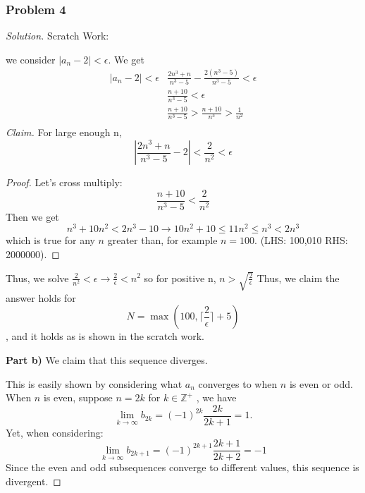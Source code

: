 \documentclass[11pt]{article}
\newcommand{\1}{\mathbf{1}}
\theoremstyle{definition}
\newenvironment{solution}{\begin{proof}[Solution]}{\end{proof}}
\begin{document}
\subsubsection*{Problem 4}
\begin{solution}
   Scratch Work:
   \par we consider $|a_n - 2| < \epsilon.$ We get 
   \begin{align}
        |a_n - 2| < \epsilon
       & \frac{2n^3+n}{n^3 - 5} - \frac{2(n^3 - 5)}{n^3 - 5} < \epsilon \\
       & \frac{n+10}{n^3 - 5} < \epsilon \\
       & \frac{n+10}{n^3 - 5} > \frac{n+10}{n^3} > \frac{1}{n^2}\\ 
   \end{align}
   \noindent\textit{Claim.} For large enough n, $$\left| \frac{2n^3 + n}{n^3 -
   5} - 2\right| <\frac{2}{n^2} < \epsilon$$

\begin{proof}
    Let's cross multiply: $$\frac{n+10}{n^3 - 5} < \frac{2}{n^2}$$
    Then we get $$n^3 + 10n^2 < 2n^3 - 10 \rightarrow 10n^2 + 10 \le 11n^2 \le n^3 < 2n^3$$ which is true
    for any $n$ greater than, for example $n = 100.$ (LHS: 100,010 RHS: 2000000).
\end{proof}
Thus, we solve $\frac{2}{n^2} < \epsilon \rightarrow \frac{2}{\epsilon} < n^2$ so for
positive n, $n > \sqrt{\frac{2}{\epsilon}}$
Thus, we claim the answer holds for $$N = \max \left(100, \lceil \frac{2}{\epsilon}\rceil + 5 \right)$$,
and it holds as is shown in the scratch work.
\par \textbf{Part b) } We claim that this sequence diverges. \par This is easily shown by
considering what $a_n$ converges to when $n$ is even or odd. When $n$ is even, suppose
$n = 2k$ for $k \in \mathbb{Z}^{+}$ , we have
$$\lim_{k\rightarrow \infty}  b_{2k} = (-1)^{2k} \frac{2k}{2k + 1} = 1.$$
Yet, when considering:
 $$\lim_{k\rightarrow \infty} b_{2k+1} = (-1)^{2k + 1}\frac{2k + 1}{2k + 2} = -1$$
 Since the even and odd subsequences converge to different values, this sequence is
 divergent.
\end{solution}
\end{document}
